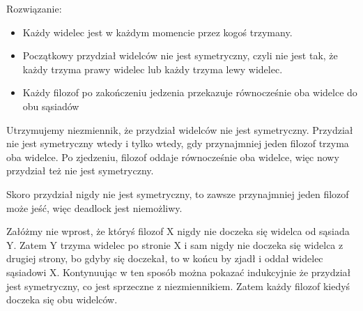 Rozwiązanie:
\begin{itemize}
\item Każdy widelec jest w każdym momencie przez kogoś trzymany.
\item Początkowy przydział widelców nie jest symetryczny, czyli nie jest tak, że każdy trzyma prawy widelec lub każdy trzyma lewy widelec.
\item Każdy filozof po zakończeniu jedzenia przekazuje równocześnie oba widelce do obu sąsiadów
\end{itemize}

Utrzymujemy niezmiennik, że przydział widelców nie jest symetryczny. Przydział nie jest symetryczny wtedy i tylko wtedy, gdy przynajmniej jeden filozof trzyma oba widelce. Po zjedzeniu, filozof oddaje równocześnie oba widelce, więc nowy przydział też nie jest symetryczny.

Skoro przydział nigdy nie jest symetryczny, to zawsze przynajmniej jeden filozof może jeść, więc deadlock jest niemożliwy.

Załóżmy nie wprost, że któryś filozof X nigdy nie doczeka się widelca od sąsiada Y. Zatem Y trzyma widelec po stronie X i sam nigdy nie doczeka się widelca z drugiej strony, bo gdyby się doczekał, to w końcu by zjadł i oddał widelec sąsiadowi X. Kontynuując w ten sposób można pokazać indukcyjnie że przydział jest symetryczny, co jest sprzeczne z niezmiennikiem. Zatem każdy filozof kiedyś doczeka się obu widelców.